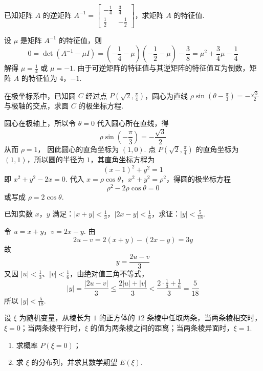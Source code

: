 \reuseproblemnumber
\begin{problem}[B]
已知矩阵 \(A\) 的逆矩阵 \(A^{-1}=\begin{bmatrix}-\frac{1}{4}&\frac{3}{4}\\ \frac{1}{2}&-\frac{1}{2}\end{bmatrix}\)，求矩阵 \(A\) 的特征值.
\end{problem}

\begin{solution}
设 \(\mu\) 是矩阵 \(A^{-1}\) 的特征值，则
\[
0=\det\left(A^{-1}-\mu I\right)=\left(-\frac14-\mu\right)\left(-\frac12-\mu\right)-\frac38=\mu^2+\frac34\mu-\frac14
\]
解得 \(\mu=\frac14\) 或 \(\mu=-1\). 由于可逆矩阵的特征值与其逆矩阵的特征值互为倒数，矩阵 \(A\) 的特征值为 \(4\)，\(-1\).
\end{solution}

\reuseproblemnumber
\begin{problem}[C]
在极坐标系中，已知圆 \(C\) 经过点 \(P\left(\sqrt{2},\frac{\pi}{4}\right)\)，圆心为直线 \(\rho\sin\left(\theta-\frac{\pi}{3}\right)=-\frac{\sqrt{3}}{2}\) 与极轴的交点，求圆 \(C\) 的极坐标方程.
\end{problem}

\begin{solution}
圆心在极轴上，所以令 \(\theta=0\) 代入圆心所在直线，得
\[
\rho\sin\left(-\frac{\pi}{3}\right)=-\frac{\sqrt{3}}{2}
\]
从而 \(\rho=1\)，
因此圆心的直角坐标为 \((1,0)\). 点 \(P\left(\sqrt{2},\frac{\pi}{4}\right)\) 的直角坐标为 \((1,1)\)，所以圆的半径为 \(1\)，其直角坐标方程为
\[
(x-1)^2+y^2=1
\]
即 \(x^2+y^2-2x=0\). 代入 \(x=\rho\cos\theta\)，\(x^2+y^2=\rho^2\)，得圆的极坐标方程
\[
\rho^2-2\rho\cos\theta=0
\]
或写成 \(\rho=2\cos\theta\).
\end{solution}

\reuseproblemnumber
\begin{problem}[D]
已知实数 \(x\)，\(y\) 满足：\(|x+y|<\frac{1}{3}\)，\(|2x-y|<\frac{1}{6}\)，求证：\(|y|<\frac{5}{18}\).
\end{problem}

\begin{solution}
令 \(u=x+y\)，\(v=2x-y\). 由
\[
2u-v=2(x+y)-(2x-y)=3y
\]
故
\[
y=\frac{2u-v}{3}
\]
又因 \(|u|<\frac13\)、\(|v|<\frac16\)，由绝对值三角不等式，
\[
|y|=\frac{|2u-v|}{3}\leqslant\frac{2|u|+|v|}{3}<\frac{2\cdot\frac13+\frac16}{3}=\frac{5}{18}
\]
所以 \(|y|<\frac{5}{18}\).
\end{solution}

\begin{problem}
设 \(\xi\) 为随机变量，从棱长为 \(1\) 的正方体的 \(12\) 条棱中任取两条，当两条棱相交时，\(\xi=0\)；当两条棱平行时，\(\xi\) 的值为两条棱之间的距离；当两条棱异面时，\(\xi=1\).

\begin{enumerate}
\item 求概率 \(P(\xi=0)\)；
\item 求 \(\xi\) 的分布列，并求其数学期望 \(E(\xi)\).
\end{enumerate}
\end{problem}

